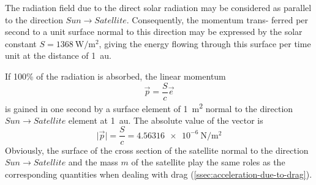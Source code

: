 The radiation ﬁeld due to the direct solar radiation may be considered as
parallel to the direction \(Sun \to Satellite\). Consequently, the momentum trans-
ferred per second to a unit surface normal to this direction may be expressed
by the solar constant \(S = \SI{1368}{\watt\per\square\m}\), giving the energy ﬂowing through this surface per
time unit at the distance of \SI{1}{\astronomicalunit}.

If 100\% of the radiation is absorbed,  the linear momentum
\begin{equation}
    \vec{p} = \frac{S}{c} \vec{e}
\end{equation}
is gained in one second by a surface element of \SI{1}{\square\metre} normal to 
the direction \(Sun \to Satellite\) element at \SI{1}{\astronomicalunit}. The 
absolute value of the vector is
\begin{equation}
    \lvert \vec{p} \rvert = \frac{S}{c} = \SI{4.56316e-6}{\N\per\square\m}
\end{equation}
Obviously, the surface of the cross section of the satellite normal to the 
direction \(Sun \to Satellite\) and the mass \(m\) of the satellite play the same roles as 
the corresponding quantities when dealing with drag (\ref{ssec:acceleration-due-to-drag}).

